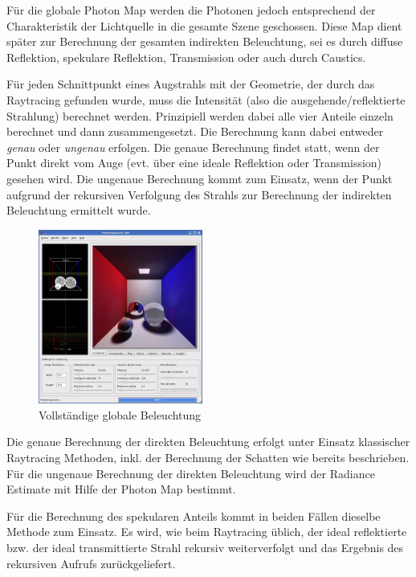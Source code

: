 \documentclass[a4paper,twocolumn,abstracton]{scrartcl}
\begin{document}
Für die globale Photon Map werden die Photonen jedoch entsprechend der Charakteristik der Lichtquelle in die gesamte Szene geschossen. Diese Map dient später zur Berechnung der gesamten indirekten Beleuchtung, sei es durch diffuse Reflektion, spekulare Reflektion, Transmission oder auch durch Caustics.

Für jeden Schnittpunkt eines Augstrahls mit der Geometrie, der durch das Raytracing gefunden wurde, muss die Intensität (also die ausgehende/reflektierte Strahlung) berechnet werden. Prinzipiell werden dabei alle vier Anteile einzeln berechnet und dann zusammengesetzt. Die Berechnung kann dabei entweder \emph{genau} oder \emph{ungenau} erfolgen. Die genaue Berechnung findet statt, wenn der Punkt direkt vom Auge (evt. über eine ideale Reflektion oder Transmission) gesehen wird. Die ungenaue Berechnung kommt zum Einsatz, wenn der Punkt aufgrund der rekursiven Verfolgung des Strahls zur Berechnung der indirekten Beleuchtung ermittelt wurde.

\begin{figure}[htb]
\centering
\includegraphics[width=0.48\textwidth]{img/combined}
\caption{Vollständige globale Beleuchtung}
\label{fig:combined}
\end{figure}

Die genaue Berechnung der direkten Beleuchtung erfolgt unter Einsatz klassischer Raytracing Methoden, inkl. der Berechnung der Schatten wie bereits beschrieben. Für die ungenaue Berechnung der direkten Beleuchtung wird der Radiance Estimate mit Hilfe der Photon Map bestimmt.

Für die Berechnung des spekularen Anteils kommt in beiden Fällen dieselbe Methode zum Einsatz. Es wird, wie beim Raytracing üblich, der ideal reflektierte bzw. der ideal transmittierte Strahl rekursiv weiterverfolgt und das Ergebnis des rekursiven Aufrufs zurückgeliefert.
\end{document}
